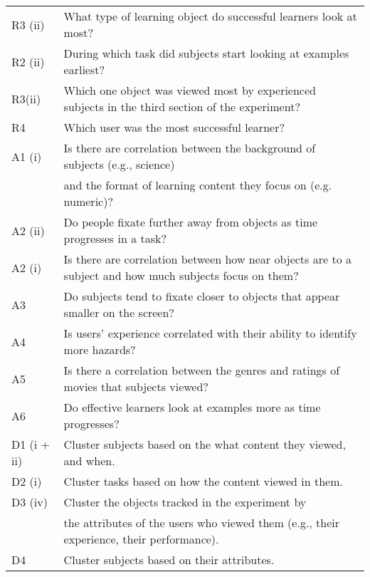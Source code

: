 \begin{sidewaystable}
\begin{tabular}{|l|l|}
R3 (ii) &What type of learning object do successful learners look at most?\\
R2 (ii)&  During which task did subjects start looking at examples earliest?\\
R3(ii) &Which one object was viewed most by experienced subjects in the third section of the experiment?\\
R4 & Which user was the most successful learner?\\
    \hline
    A1 (i)& Is there are correlation between the background of subjects (e.g., science) \\&and the format of learning content they focus on (e.g. numeric)?\\
A2 (ii)& Do people fixate further away from objects as time progresses in a task?\\
A2 (i) & Is there are correlation between how near objects are to a subject and how much subjects focus on them?\\
A3 &  Do subjects tend to fixate closer to objects that appear smaller on the screen?\\
A4& Is users’ experience correlated with their ability to identify more hazards? \\
A5& Is there a correlation between the genres and ratings of movies that subjects viewed? \\
A6& Do effective learners look at examples more as time progresses?\\
\hline
D1 (i + ii) & Cluster subjects based on the what content they viewed, and when.\\
D2 (i) & Cluster tasks based on how the content viewed in them. \\
D3 (iv) &Cluster the objects tracked in the experiment by \\&the attributes of the users who viewed them (e.g., their experience, their performance).
\\
D4 & Cluster subjects based on their attributes. \\
\hline
    \end{tabular} 
    
    \label{tab:Tasks}
\end{sidewaystable}


